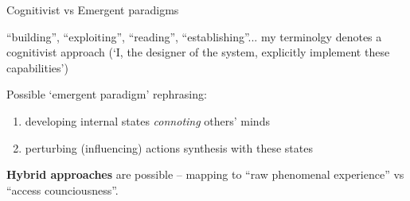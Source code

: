 \documentclass[handout,compress]{beamer}
\begin{document}

{
\begin{frame}{Cognitivist vs Emergent paradigms}

    ``building'', ``exploiting'', ``reading'', ``establishing''... my terminolgy
    denotes a cognitivist approach (`I, the designer of the system, explicitly implement
    these capabilities')

    \pause
    
    Possible `emergent paradigm' rephrasing:

    \begin{enumerate}
        \item developing internal states \emph{connoting} others' minds
        \item perturbing (influencing) actions synthesis with these states
    \end{enumerate}

    \pause

    {\bf Hybrid approaches} are possible -- mapping to ``raw phenomenal experience'' vs
    ``access counciousness''.
\end{frame}
}

\end{document}
